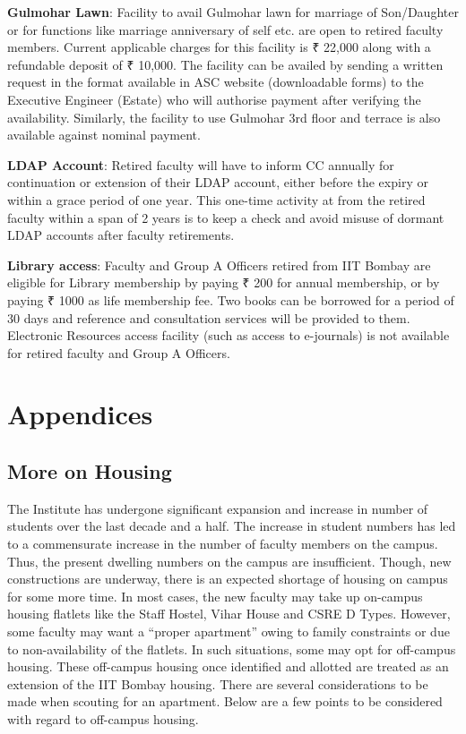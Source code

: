 \documentclass[
  10pt,
  a5paper,
  10pt,
  openany]{amsbook}
\begin{document}
\textbf{Gulmohar Lawn}: Facility to avail Gulmohar lawn for marriage of
Son/Daughter or for functions like marriage anniversary of self etc. are
open to retired faculty members. Current applicable charges for this
facility is ₹ 22,000 along with a refundable deposit of ₹ 10,000. The
facility can be availed by sending a written request in the format
available in ASC website (downloadable forms) to the Executive Engineer
(Estate) who will authorise payment after verifying the availability.
Similarly, the facility to use Gulmohar 3rd floor and terrace is also
available against nominal payment.

\textbf{LDAP Account}: Retired faculty will have to inform CC annually
for continuation or extension of their LDAP account, either before the
expiry or within a grace period of one year. This one-time activity at
from the retired faculty within a span of 2 years is to keep a check and
avoid misuse of dormant LDAP accounts after faculty retirements.

\textbf{Library access}: Faculty and Group A Officers retired from IIT
Bombay are eligible for Library membership by paying ₹ 200 for annual
membership, or by paying ₹ 1000 as life membership fee. Two books can be
borrowed for a period of 30 days and reference and consultation services
will be provided to them. Electronic Resources access facility (such as
access to e-journals) is not available for retired faculty and Group A
Officers.


\chapter*{Appendices}\label{appendices}


\section*{More on Housing}\label{sec:morehousing}


The Institute has undergone significant expansion and increase in number
of students over the last decade and a half. The increase in student
numbers has led to a commensurate increase in the number of faculty
members on the campus. Thus, the present dwelling numbers on the campus
are insufficient. Though, new constructions are underway, there is an
expected shortage of housing on campus for some more time. In most
cases, the new faculty may take up on-campus housing flatlets like the
Staff Hostel, Vihar House and CSRE D Types. However, some faculty may
want a ``proper apartment'' owing to family constraints or due to
non-availability of the flatlets. In such situations, some may opt for
off-campus housing. These off-campus housing once identified and
allotted are treated as an extension of the IIT Bombay housing. There
are several considerations to be made when scouting for an apartment.
Below are a few points to be considered with regard to off-campus
housing.
\end{document}
